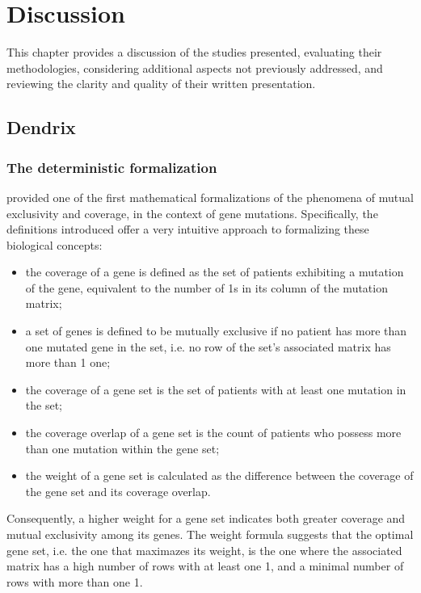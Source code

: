 \chapter{Discussion} \label{chap:discussion}

This chapter provides a discussion of the studies presented, evaluating their methodologies, considering additional aspects not previously addressed, and reviewing the clarity and quality of their written presentation.

\section{Dendrix}

\subsection{The deterministic formalization}

\textcite{dendrix} provided one of the first mathematical formalizations of the phenomena of mutual exclusivity and coverage, in the context of gene mutations. Specifically, the definitions introduced offer a very intuitive approach to formalizing these biological concepts:

\begin{itemize}
    \item the coverage of a gene is defined as the set of patients exhibiting a mutation of the gene, equivalent to the number of 1s in its column of the mutation matrix;
    \item a set of genes is defined to be mutually exclusive if no patient has more than one mutated gene in the set, i.e. no row of the set's associated matrix has more than 1 one;
    \item the coverage of a gene set is the set of patients with at least one mutation in the set;
    \item the coverage overlap of a gene set is the count of patients who possess more than one mutation within the gene set;
    \item the weight of a gene set is calculated as the difference between the coverage of the gene set and its coverage overlap.
\end{itemize}

Consequently, a higher weight for a gene set indicates both greater coverage and mutual exclusivity among its genes. The weight formula suggests that the optimal gene set, i.e. the one that maximazes its weight, is the one where the associated matrix has a high number of rows with at least one 1, and a minimal number of rows with more than one 1.

